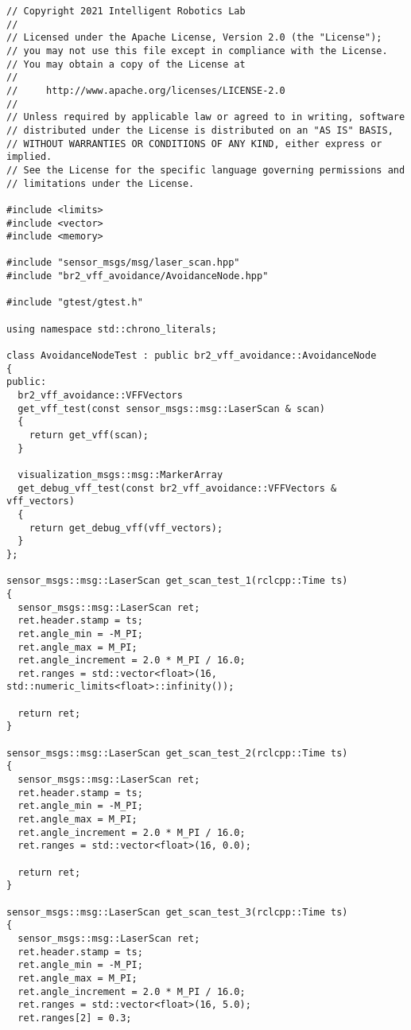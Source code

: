  \footnotesize
\begin{tcolorbox}[sharp corners, colframe=gray!80, colback=LightGray, left=0pt, top=0pt, bottom=0pt, title=\texttt{br2\_vff\_avoidance/tests/vff\_test.cpp}]
  \begin{verbatim}
// Copyright 2021 Intelligent Robotics Lab
//
// Licensed under the Apache License, Version 2.0 (the "License");
// you may not use this file except in compliance with the License.
// You may obtain a copy of the License at
//
//     http://www.apache.org/licenses/LICENSE-2.0
//
// Unless required by applicable law or agreed to in writing, software
// distributed under the License is distributed on an "AS IS" BASIS,
// WITHOUT WARRANTIES OR CONDITIONS OF ANY KIND, either express or implied.
// See the License for the specific language governing permissions and
// limitations under the License.

#include <limits>
#include <vector>
#include <memory>

#include "sensor_msgs/msg/laser_scan.hpp"
#include "br2_vff_avoidance/AvoidanceNode.hpp"

#include "gtest/gtest.h"

using namespace std::chrono_literals;

class AvoidanceNodeTest : public br2_vff_avoidance::AvoidanceNode
{
public:
  br2_vff_avoidance::VFFVectors
  get_vff_test(const sensor_msgs::msg::LaserScan & scan)
  {
    return get_vff(scan);
  }

  visualization_msgs::msg::MarkerArray
  get_debug_vff_test(const br2_vff_avoidance::VFFVectors & vff_vectors)
  {
    return get_debug_vff(vff_vectors);
  }
};

sensor_msgs::msg::LaserScan get_scan_test_1(rclcpp::Time ts)
{
  sensor_msgs::msg::LaserScan ret;
  ret.header.stamp = ts;
  ret.angle_min = -M_PI;
  ret.angle_max = M_PI;
  ret.angle_increment = 2.0 * M_PI / 16.0;
  ret.ranges = std::vector<float>(16, std::numeric_limits<float>::infinity());

  return ret;
}

sensor_msgs::msg::LaserScan get_scan_test_2(rclcpp::Time ts)
{
  sensor_msgs::msg::LaserScan ret;
  ret.header.stamp = ts;
  ret.angle_min = -M_PI;
  ret.angle_max = M_PI;
  ret.angle_increment = 2.0 * M_PI / 16.0;
  ret.ranges = std::vector<float>(16, 0.0);

  return ret;
}

sensor_msgs::msg::LaserScan get_scan_test_3(rclcpp::Time ts)
{
  sensor_msgs::msg::LaserScan ret;
  ret.header.stamp = ts;
  ret.angle_min = -M_PI;
  ret.angle_max = M_PI;
  ret.angle_increment = 2.0 * M_PI / 16.0;
  ret.ranges = std::vector<float>(16, 5.0);
  ret.ranges[2] = 0.3;


\end{verbatim}
\end{tcolorbox}
